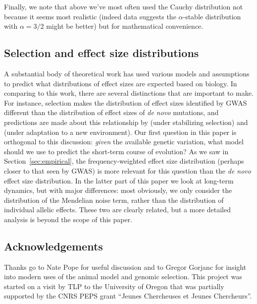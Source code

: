 \documentclass{article}
\newcommand{\1}{\mathbbm{1}}
\theoremstyle{remark}
\theoremstyle{definition}
\begin{document}
Finally, we note that above we've most often used the Cauchy distribution
not because it seems most realistic
(indeed data suggests the $\alpha$-stable distribution with $\alpha=3/2$ might be better) 
but for mathematical convenience.

\subsection*{Selection and effect size distributions} 
A substantial body of theoretical work has used various models and assumptions
to predict what distributions of effect sizes are expected based on biology.
In comparing to this work, there are several distinctions that are important to make.
For instance, selection makes the distribution of effect sizes identified by GWAS
different than the distribution of effect sizes of \emph{de novo} mutations,
and predictions are made about this relationship by \citet{simons2018population} %
(under stabilizing selection)
and \citet{hayward2022polygenic}
(under adaptation to a new environment).
Our first question in this paper is orthogonal to this discussion:
\emph{given} the available genetic variation,
what model should we use to predict the short-term course of evolution?
As we saw in Section~\ref{sec:empirical},
the frequency-weighted effect size distribution (perhaps closer to that seen by GWAS)
is more relevant for this question than the \emph{de novo} effect size distribution.
In the latter part of this paper we look at long-term dynamics,
but with major differences:
most obviously, we only consider the distribution of the Mendelian noise term,
rather than the distribution of individual allelic effects.
These two are clearly related, but a more detailed analysis is beyond the scope of this paper.

\subsection*{Acknowledgements}
Thanks go to Nate Pope for useful discussion
and to Gregor Gorjanc for insight into modern uses
of the animal model and genomic selection. 
This project was started on a visit by TLP to the University of Oregon that was partially supported by the CNRS PEPS grant ``Jeunes Chercheuses et Jeunes Chercheurs''.




\appendix
\setcounter{table}{0}
\renewcommand{\thetable}{S\arabic{table}}
\setcounter{figure}{0}
\renewcommand{\thefigure}{S\arabic{figure}}
\end{document}
